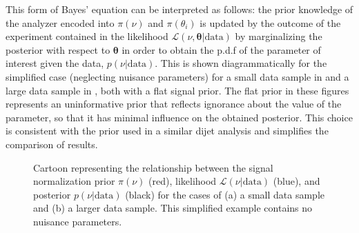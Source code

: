 This form of Bayes' equation can be interpreted as follows: the prior knowledge
of the analyzer encoded into $\pi(\nu)$ and $\pi(\theta_{i})$ is updated by
the outcome of the experiment contained in the likelihood
$\mathcal{L}(\nu,\boldsymbol{\theta}|\text{data})$ by marginalizing the
posterior with respect to $\boldsymbol{\theta}$ in order to obtain the p.d.f of the
parameter of interest given the data, $p(\nu|\text{data})$.  This is shown
diagrammatically for the simplified case (neglecting nuisance parameters) for a
small data sample in  and a large data sample in
, both with a flat signal prior.  The flat prior in
these figures represents an uninformative prior that reflects ignorance about
the value of the parameter, so that it has minimal influence on the obtained
posterior.  This choice is consistent with the prior used in a similar dijet analysis
\cite{Beresford:2642397} and simplifies the comparison of results.

\begin{figure}[!htbp]
\centering
{} \hfill
{}
\caption{Cartoon representing the relationship between the signal normalization prior $\pi(\nu)$ (red), likelihood $\mathcal{L}(\nu|\text{data})$ (blue), and posterior $p(\nu|\text{data})$ (black) for the cases of (a) a small data sample and (b) a larger data sample.  This simplified example contains no nuisance parameters.}
\label{sec:fit:marginalization}
\end{figure}

